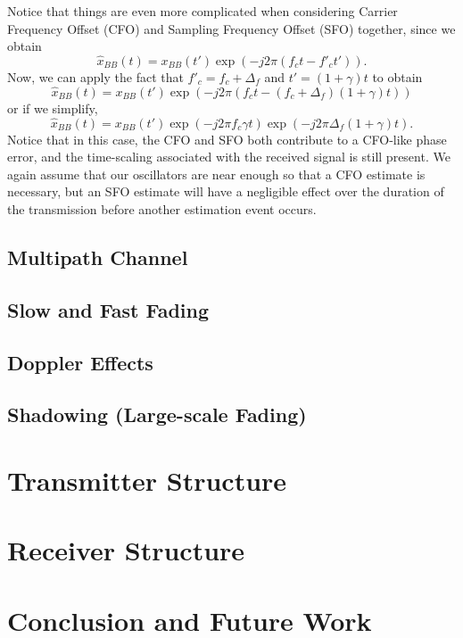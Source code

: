 \documentclass[conference]{IEEEtran}
\begin{document}
Notice that things are even more complicated when considering Carrier
Frequency Offset (CFO) and Sampling Frequency Offset (SFO) together, since
we obtain
\begin{equation}
\hat{x}_{BB}(t) = x_{BB}(t') \exp\left(-j 2 \pi \left(f_c t - f'_c t'\right)\right).
\end{equation}
Now, we can apply the fact that $f'_c = f_c + \Delta_f$ and $t' = (1 + \gamma) t$
to obtain
\begin{equation}
\hat{x}_{BB}(t) = x_{BB}(t') \exp\left(-j 2 \pi \left(f_c t - \left(f_c + \Delta_f\right) \left(1 + \gamma\right) t \right)\right)
\end{equation}
or if we simplify,
\begin{equation}
\hat{x}_{BB}(t) = x_{BB}(t') \exp\left(-j 2 \pi f_c \gamma t\right) \exp\left(-j 2 \pi \Delta_f \left(1 + \gamma\right) t\right).
\end{equation}
Notice that in this case, the CFO and SFO both contribute to a CFO-like phase
error, and the time-scaling associated with the received signal is still present.
We again assume that our oscillators are near enough so that a CFO estimate is
necessary, but an SFO estimate will have a negligible effect over the duration
of the transmission before another estimation event occurs.


\subsection*{Multipath Channel}

\subsection*{Slow and Fast Fading}

\subsection*{Doppler Effects}

\subsection*{Shadowing (Large-scale Fading)}

\section{Transmitter Structure}
\label{sec:tx}

\section{Receiver Structure}
\label{sec:rx}

\section{Conclusion and Future Work}
\label{sec:conc}
\end{document}

